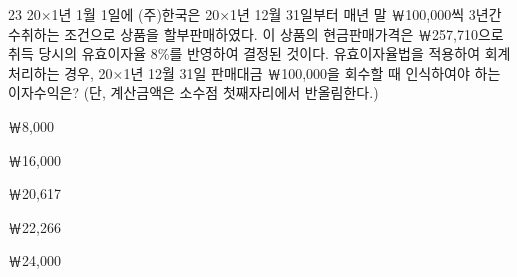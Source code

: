 \begin{question}{23}
20×1년 1월 1일에 (주)한국은 20×1년 12월 31일부터 매년 말 ￦100,000씩 3년간 수취하는 조건으로 상품을 할부판매하였다. 이 상품의 현금판매가격은 ￦257,710으로 취득 당시의 유효이자율 8\%를 반영하여 결정된 것이다. 유효이자율법을 적용하여 회계처리하는 경우, 20×1년 12월 31일 판매대금 ￦100,000을 회수할 때 인식하여야 하는 이자수익은? (단, 계산금액은 소수점 첫째자리에서 반올림한다.)
\begin{choices}
  \item ￦8,000
  \item ￦16,000
  \item ￦20,617
  \item ￦22,266
  \item ￦24,000
\end{choices}
\end{question}
